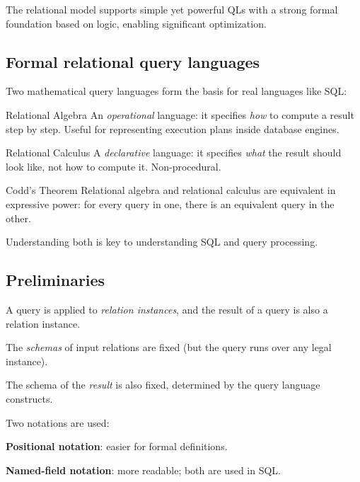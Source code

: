 \documentclass[../../dis.tex]{subfiles}
\begin{document}
The relational model supports simple yet powerful QLs with a strong formal foundation based on logic, enabling significant optimization.

\subsection{Formal relational query languages}
Two mathematical query languages form the basis for real languages like SQL:

\begin{concept}{Relational Algebra}
An \emph{operational} language: it specifies \emph{how} to compute a result step by step. Useful for representing execution plans inside database engines.
\end{concept}

\begin{concept}{Relational Calculus}
A \emph{declarative} language: it specifies \emph{what} the result should look like, not how to compute it. Non-procedural.
\end{concept}

\begin{concept}{Codd's Theorem}
Relational algebra and relational calculus are equivalent in expressive power: for every query in one, there is an equivalent query in the other.
\end{concept}

Understanding both is key to understanding SQL and query processing.

\subsection{Preliminaries}
A query is applied to \emph{relation instances}, and the result of a query is also a relation instance.
\begin{dashlist}
    \item The \emph{schemas} of input relations are fixed (but the query runs over any legal instance).
    \item The schema of the \emph{result} is also fixed, determined by the query language constructs.
\end{dashlist}

Two notations are used:
\begin{dashlist}
    \item \textbf{Positional notation}: easier for formal definitions.
    \item \textbf{Named-field notation}: more readable; both are used in SQL.
\end{dashlist}
\end{document}
